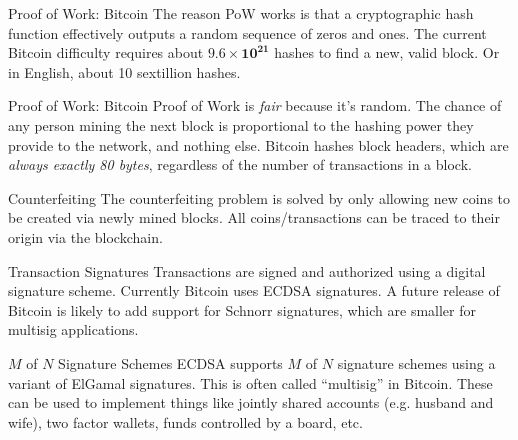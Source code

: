 \documentclass[14pt]{beamer}
\begin{document}
\begin{frame}{Proof of Work: Bitcoin}
  The reason PoW works is that a cryptographic hash function effectively outputs
  a random sequence of zeros and ones.
  \newline
  \newline
  The current Bitcoin difficulty requires about $\mathbf{9.6 \times 10^{21}}$ hashes to find
  a new, valid block. Or in English, about 10 sextillion hashes.
\end{frame}

\begin{frame}{Proof of Work: Bitcoin}
  Proof of Work is \emph{fair} because it's random.
  \newline
  \newline
  The chance of any person mining the next block is proportional to the hashing
  power they provide to the network, and nothing else.
  \newline
  \newline
  Bitcoin hashes block headers, which are \emph{always exactly 80 bytes},
  regardless of the number of transactions in a block.
\end{frame}

\begin{frame}{Counterfeiting}
  The counterfeiting problem is solved by only allowing new coins to be created
  via newly mined blocks.
  \newline
  \newline
  All coins/transactions can be traced to their origin via the blockchain.
\end{frame}

\begin{frame}{Transaction Signatures}
  Transactions are signed and authorized using a digital signature scheme.
  \newline
  \newline
  Currently Bitcoin uses ECDSA signatures. A future release of Bitcoin is likely
  to add support for Schnorr signatures, which are smaller for multisig
  applications.
\end{frame}

\begin{frame}{$M$ of $N$ Signature Schemes}
  ECDSA supports $M$ of $N$ signature schemes using a variant of ElGamal
  signatures. This is often called ``multisig'' in Bitcoin.
  \newline
  \newline
  These can be used to implement things like jointly shared accounts (e.g.
  husband and wife), two factor wallets, funds controlled by a board, etc.
\end{frame}
\end{document}
